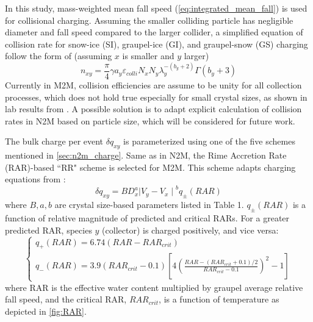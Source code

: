 In this study, mass-weighted mean fall speed (\ref{eq:integrated_mean_fall}) is used for collisional charging. Assuming the smaller colliding particle has negligible diameter and fall speed compared to the larger collider, a simplified equation of collision rate for snow-ice (SI), graupel-ice (GI), and graupel-snow (GS) charging follow the form of (assuming $x$ is smaller and $y$ larger)
\begin{equation}
    n_{xy} = 
    \frac{\pi}{4}
    \gamma a_y 
    \varepsilon_{colli}
    N_x N_y 
    \lambda_y^{-(b_y+2)}
    \Gamma(b_y+3)
    \label{eq:3.16}
\end{equation}
Currently in M2M, collision efficiencies are assume to be unity for all collection processes, which does not hold true especially for small crystal sizes, as shown in lab results from \cite{keith1989collection}. A possible solution is to adapt explicit calculation of collision rates in N2M based on particle size, which will be considered for future work.

The bulk charge per event $\delta q_{xy}$ is parameterized using one of the five schemes mentioned in \ref{sec:n2m_charge}. Same as in N2M, the Rime Accretion Rate (RAR)-based ``RR" scheme is selected for M2M. This scheme adapts charging equations from \cite{brooks1997effect}:
\begin{equation}
    \delta q_{xy} = 
    B D_x^a 
    {\mid V_y - V_x \mid}^b
    q_{\pm}(RAR)
    \label{eq:3.17}
\end{equation}
where $B,a,b$ are crystal size-based parameters listed in \cite{mansell2005charge} Table 1. $q_{\pm}(RAR)$ is a function of relative magnitude of predicted and critical RARs. For a greater predicted RAR, species $y$ (collector) is charged positively, and vice versa:
\begin{equation}
    \begin{cases}
        q_+(RAR) = 6.74(RAR-RAR_{crit}) \\
        q_-(RAR) = 3.9(RAR_{crit}-0.1)
        \left[
        4(\frac{RAR-(RAR_{crit}+0.1)/2}{RAR_{crit}-0.1})^2 -1
        \right]
    \end{cases}
\end{equation}
where RAR is the effective water content multiplied by graupel average relative fall speed, and the critical RAR, $RAR_{crit}$, is a function of temperature as depicted in \ref{fig:RAR}.
